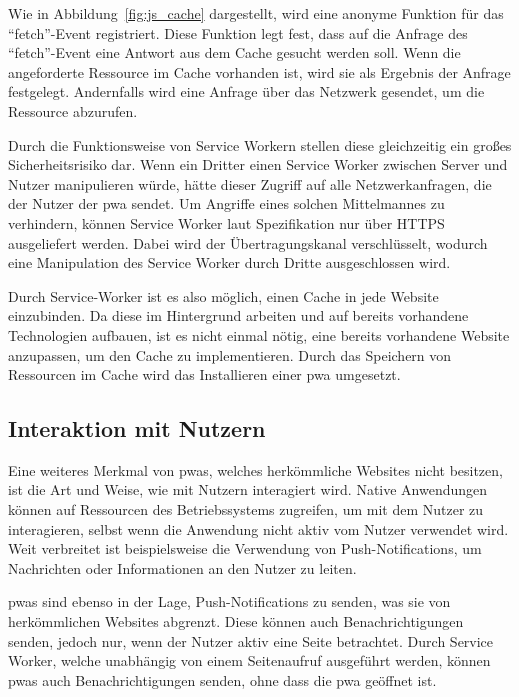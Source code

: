 \documentclass[12pt, parskip=half]{scrartcl}       %
\begin{document}
Wie in Abbildung~\ref{fig:js_cache} dargestellt, wird eine anonyme Funktion für das \enquote{fetch}-Event registriert.
Diese Funktion legt fest, dass auf die Anfrage des \enquote{fetch}-Event eine Antwort aus dem Cache gesucht werden soll.
Wenn die angeforderte Ressource im Cache vorhanden ist, wird sie als Ergebnis der Anfrage festgelegt.
Andernfalls wird eine Anfrage über das Netzwerk gesendet, um die Ressource abzurufen.

Durch die Funktionsweise von Service Workern stellen diese gleichzeitig ein großes Sicherheitsrisiko dar.
Wenn ein Dritter einen Service Worker zwischen Server und Nutzer manipulieren würde, hätte dieser Zugriff auf alle Netzwerkanfragen, die der Nutzer der \ac{pwa} sendet.
Um Angriffe eines solchen Mittelmannes zu verhindern, können Service Worker laut Spezifikation nur über HTTPS ausgeliefert werden.
Dabei wird der Übertragungskanal verschlüsselt, wodurch eine Manipulation des Service Worker durch Dritte ausgeschlossen wird.

Durch Service-Worker ist es also möglich, einen Cache in jede Website einzubinden.
Da diese im Hintergrund arbeiten und auf bereits vorhandene Technologien aufbauen, ist es nicht einmal nötig, eine bereits vorhandene Website anzupassen, um den Cache zu implementieren.
Durch das Speichern von Ressourcen im Cache wird das Installieren einer \ac{pwa} umgesetzt.

\subsection{Interaktion mit Nutzern}

Eine weiteres Merkmal von \acp{pwa}, welches herkömmliche Websites nicht besitzen, ist die Art und Weise, wie mit Nutzern interagiert wird.
Native Anwendungen können auf Ressourcen des Betriebssystems zugreifen, um mit dem Nutzer zu interagieren, selbst wenn die Anwendung nicht aktiv vom Nutzer verwendet wird.
Weit verbreitet ist beispielsweise die Verwendung von Push-Notifications\cite{businessofapps_pushnotificationstatistics}, um Nachrichten oder Informationen an den Nutzer zu leiten.

\acp{pwa} sind ebenso in der Lage, Push-Notifications zu senden, was sie von herkömmlichen Websites abgrenzt.
Diese können auch Benachrichtigungen senden, jedoch nur, wenn der Nutzer aktiv eine Seite betrachtet.
Durch Service Worker, welche unabhängig von einem Seitenaufruf ausgeführt werden, können \acp{pwa} auch Benachrichtigungen senden, ohne dass die \ac{pwa} geöffnet ist\cite{ejaz_progressive_pushnotifications}.
\end{document}
